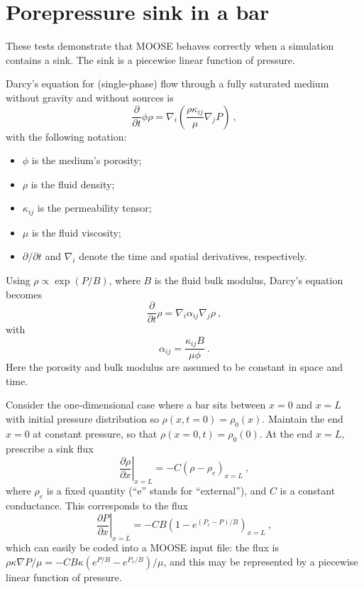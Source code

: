 \section{Porepressure sink in a bar}
\label{pp.sec}

These tests demonstrate that MOOSE behaves correctly when a simulation
contains a sink.  The sink is a piecewise linear function of pressure.

Darcy's equation for (single-phase) flow through a fully saturated medium without
gravity and without sources is
\begin{equation}
\frac{\partial}{\partial t}\phi\rho = \nabla_{i}\left(\frac{\rho
  \kappa_{ij}}{\mu} \nabla_{j}P \right) \ ,
\end{equation}
with the following notation:
\begin{itemize}
\item $\phi$ is the medium's porosity;
\item $\rho$ is the fluid density;
\item $\kappa_{ij}$ is the permeability tensor;
\item $\mu$ is the fluid viscosity;
\item $\partial/\partial t$ and $\nabla_{i}$ denote the time and spatial derivatives, respectively.
\end{itemize}
Using $\rho \propto
\exp(P/B)$, where $B$ is the fluid bulk modulus, Darcy's equation
becomes
\begin{equation}
\frac{\partial}{\partial t}\rho = \nabla_{i}\alpha_{ij}\nabla_{j}\rho \ ,
\end{equation}
with
\begin{equation}
\alpha_{ij} = \frac{\kappa_{ij}B}{\mu\phi} \ .
\end{equation}
Here the porosity and bulk modulus are assumed to be constant in space
and time.

Consider the one-dimensional case where a bar sits between $x=0$ and
$x=L$ with initial pressure distribution so $\rho(x,t=0) = \rho_{0}(x)$.
Maintain the end $x=0$ at constant pressure, so that $\rho(x=0, t) =
\rho_{0}(0)$.  At the end $x=L$, prescribe a sink flux
\begin{equation}
\left.\frac{\partial\rho}{\partial x}\right|_{x=L} = -C\left(\rho -
\rho_{e}\right)_{x=L} \ ,
\end{equation}
where $\rho_{e}$ is a fixed quantity (``e'' stands for ``external''),
and $C$ is a constant conductance.  This corresponds to the flux
\begin{equation}
\left.\frac{\partial P}{\partial x}\right|_{x=L} = -CB\left(1 -
e^{(P_{e}-P)/B}\right)_{x=L} \ ,
\end{equation}
which can easily be coded into a MOOSE input file: the flux is
$\rho\kappa\nabla P/\mu = -CB\kappa(e^{P/B} - e^{P_{e}/B})/\mu$, and
this may be represented by a piecewise linear function of pressure.

